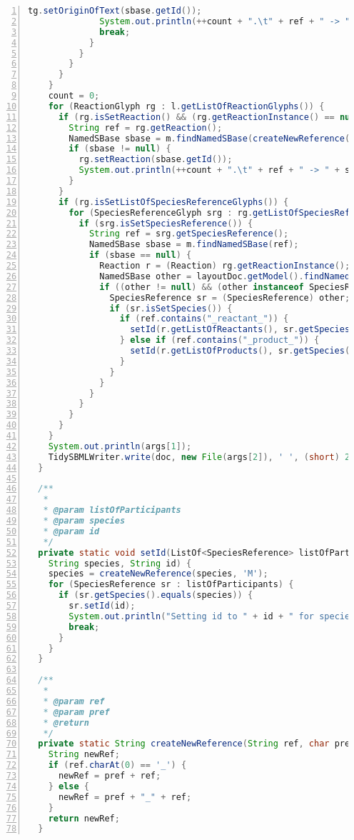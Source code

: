 \begin{lstlisting}[language=Java,numbers=left,captionpos=t,caption={Example script for merging an SBML layout into a model},label={lst:modelMerge}]
              tg.setOriginOfText(sbase.getId());
              System.out.println(++count + ".\t" + ref + " -> " + sbase.getId());
              break;
            }
          }
        }
      }
    }
    count = 0;
    for (ReactionGlyph rg : l.getListOfReactionGlyphs()) {
      if (rg.isSetReaction() && (rg.getReactionInstance() == null)) {
        String ref = rg.getReaction();
        NamedSBase sbase = m.findNamedSBase(createNewReference(ref, 'R'));
        if (sbase != null) {
          rg.setReaction(sbase.getId());
          System.out.println(++count + ".\t" + ref + " -> " + sbase.getId());
        }
      }
      if (rg.isSetListOfSpeciesReferenceGlyphs()) {
        for (SpeciesReferenceGlyph srg : rg.getListOfSpeciesReferenceGlyphs()) {
          if (srg.isSetSpeciesReference()) {
            String ref = srg.getSpeciesReference();
            NamedSBase sbase = m.findNamedSBase(ref);
            if (sbase == null) {
              Reaction r = (Reaction) rg.getReactionInstance();
              NamedSBase other = layoutDoc.getModel().findNamedSBase(ref);
              if ((other != null) && (other instanceof SpeciesReference)) {
                SpeciesReference sr = (SpeciesReference) other;
                if (sr.isSetSpecies()) {
                  if (ref.contains("_reactant_")) {
                    setId(r.getListOfReactants(), sr.getSpecies(), ref);
                  } else if (ref.contains("_product_")) {
                    setId(r.getListOfProducts(), sr.getSpecies(), ref);
                  }
                }
              }
            }
          }
        }
      }
    }
    System.out.println(args[1]);
    TidySBMLWriter.write(doc, new File(args[2]), ' ', (short) 2);
  }

  /**
   *
   * @param listOfParticipants
   * @param species
   * @param id
   */
  private static void setId(ListOf<SpeciesReference> listOfParticipants,
    String species, String id) {
    species = createNewReference(species, 'M');
    for (SpeciesReference sr : listOfParticipants) {
      if (sr.getSpecies().equals(species)) {
        sr.setId(id);
        System.out.println("Setting id to " + id + " for speciesReference to " + species);
        break;
      }
    }
  }

  /**
   *
   * @param ref
   * @param pref
   * @return
   */
  private static String createNewReference(String ref, char pref) {
    String newRef;
    if (ref.charAt(0) == '_') {
      newRef = pref + ref;
    } else {
      newRef = pref + "_" + ref;
    }
    return newRef;
  }
\end{lstlisting}


